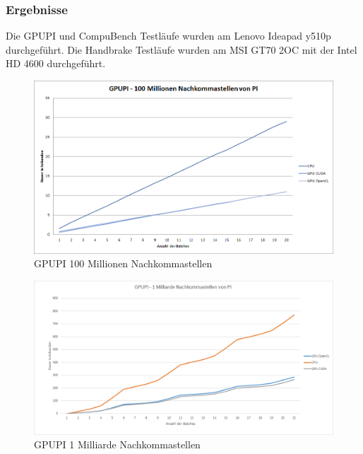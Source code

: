 \subsubsection{Ergebnisse}
Die GPUPI und CompuBench Testläufe wurden am Lenovo Ideapad y510p durchgeführt.
Die Handbrake Testläufe wurden am MSI GT70 2OC mit der Intel HD 4600 durchgeführt.
\begin{figure}[!h]
	\begin{center}
		\includegraphics[width=1.0\linewidth]{images/GPUPI_100M.png}
		\caption{GPUPI 100 Millionen Nachkommastellen}
		\label{GPUPI_100M}
	\end{center}
\end{figure}

\begin{figure}[!h]
	\begin{center}
		\includegraphics[width=1.0\linewidth]{images/GPUPI_1B.png}
		\caption{GPUPI 1 Milliarde Nachkommastellen}
		\label{GPUPI_1B}
	\end{center}
\end{figure}

